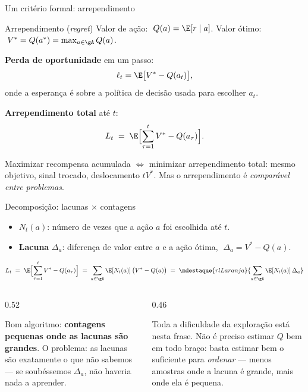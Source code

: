 \documentclass[aspectratio=169, 10pt]{beamer}
\newcommand{\Nc}{N}                         %
\newcommand{\gap}{\Delta}
\newcommand{\Reg}{L}
\begin{document}
\begin{frame}{Um critério formal: arrependimento}
  \begin{defbox}{Arrependimento (\emph{regret})}
    Valor de ação: $\;Q(a) = \E[r \mid a]$. \quad
    Valor ótimo: $\;V^{*} = Q(a^{*}) = \max_{a \in \gA} Q(a)$.
    \smallskip

    \textbf{Perda de oportunidade} em um passo:
    \[ \ell_t = \E\bigl[V^{*} - Q(a_t)\bigr], \]
    onde a esperança é sobre a política de decisão usada para escolher $a_t$.
    \smallskip

    \textbf{Arrependimento total} até $t$:
    \[
      \Reg_t \;=\; \E\Bigl[\sum_{\tau=1}^{t} V^{*} - Q(a_\tau)\Bigr].
    \]
  \end{defbox}

  \vspace{-2.5mm}
  \begin{ideiabox}
    Maximizar recompensa acumulada $\iff$ minimizar arrependimento total:
    mesmo objetivo, sinal trocado, deslocamento $tV^{*}$. Mas o
    arrependimento é \emph{comparável entre problemas}.
  \end{ideiabox}
\end{frame}

\begin{frame}{Decomposição: lacunas $\times$ contagens}
  \begin{itemize}
    \item $\Nc_t(a)$: número de vezes que a ação $a$ foi escolhida até $t$.
    \item \textbf{Lacuna} $\gap_a$: diferença de valor entre $a$ e a ação
          ótima, $\;\gap_a = V^{*} - Q(a)$.
  \end{itemize}

  \[
    \Reg_t \;=\; \E\Bigl[\sum_{\tau=1}^{t} V^{*} - Q(a_\tau)\Bigr]
      \;=\; \sum_{a \in \gA} \E[\Nc_t(a)]\,\bigl(V^{*} - Q(a)\bigr)
      \;=\; \mdestaque{rlLaranja}{\sum_{a \in \gA} \E[\Nc_t(a)]\,\gap_a}
  \]

  \begin{columns}[T]
    \begin{column}{0.52\textwidth}
      \begin{ideiabox}
        Bom algoritmo: \textbf{contagens pequenas onde as lacunas são
        grandes}. O problema: as lacunas são exatamente o que não sabemos
        --- se soubéssemos $\gap_a$, não haveria nada a aprender.
      \end{ideiabox}
    \end{column}
    \begin{column}{0.46\textwidth}
      \begin{alertabox}
        Toda a dificuldade da exploração está nesta frase. Não é preciso
        estimar $Q$ bem em todo braço: basta estimar bem o suficiente para
        \emph{ordenar} --- menos amostras onde a lacuna é grande, mais onde
        ela é pequena.
      \end{alertabox}
    \end{column}
  \end{columns}
\end{frame}
\end{document}
